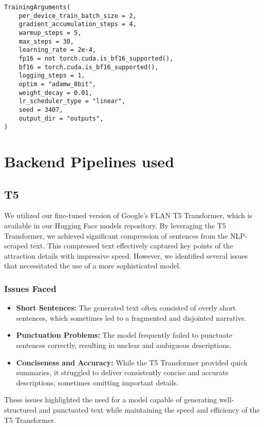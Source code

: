 \documentclass[conference]{IEEEtran}
\begin{document}
            \begin{verbatim}
TrainingArguments(
    per_device_train_batch_size = 2,
    gradient_accumulation_steps = 4,
    warmup_steps = 5,
    max_steps = 30,
    learning_rate = 2e-4,
    fp16 = not torch.cuda.is_bf16_supported(),
    bf16 = torch.cuda.is_bf16_supported(),
    logging_steps = 1,
    optim = "adamw_8bit",
    weight_decay = 0.01,
    lr_scheduler_type = "linear",
    seed = 3407,
    output_dir = "outputs",
)
            \end{verbatim}


\section{Backend Pipelines used}

    \subsection{T5}

        We utilized our fine-tuned version of Google's FLAN T5 Transformer, which is available in our Hugging Face models repository. By leveraging the T5 Transformer, we achieved significant compression of sentences from the NLP-scraped text. This compressed text effectively captured key points of the attraction details with impressive speed. However, we identified several issues that necessitated the use of a more sophisticated model.

        \subsubsection{Issues Faced}
            \begin{itemize}
                \item \textbf{Short Sentences:} The generated text often consisted of overly short sentences, which sometimes led to a fragmented and disjointed narrative.
                \item \textbf{Punctuation Problems:} The model frequently failed to punctuate sentences correctly, resulting in unclear and ambiguous descriptions.
                \item \textbf{Conciseness and Accuracy:} While the T5 Transformer provided quick summaries, it struggled to deliver consistently concise and accurate descriptions, sometimes omitting important details.
            \end{itemize}

            These issues highlighted the need for a model capable of generating well-structured and punctuated text while maintaining the speed and efficiency of the T5 Transformer.
\end{document}
